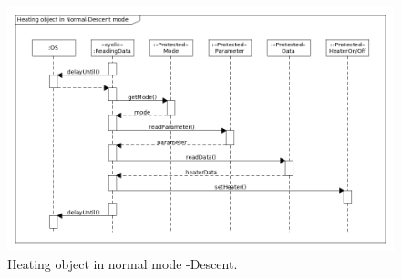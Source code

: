 \begin{figure}[H]
    \centering
    \includegraphics[height=0.9\textwidth, angle=270]{appendix/img/heater-seq-dia-c.png}
    \caption{Heating object in normal mode -Descent.}
    \label{heaterc}
\end{figure}
